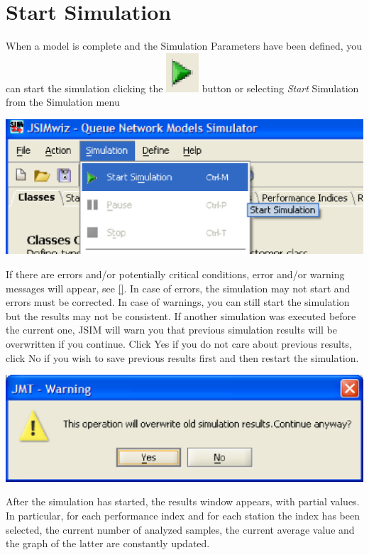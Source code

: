 \section{Start Simulation}
\label{sec:StartSimulation}
When a model is complete and the Simulation Parameters have been defined, you can start the simulation clicking the \includegraphics[scale=.5]{img/jsim/start2.eps} button or selecting \emph{Start} Simulation from the Simulation menu
\begin{center}
\includegraphics[scale=.5]{img/jsim/start1.eps}
\end{center}
If there are errors and/or potentially critical conditions, error and/or warning messages will appear, see \autoref{}. In case of errors, the simulation may not start
and errors must be corrected. In case of warnings, you can still start the simulation but the results may not be consistent.
If another simulation was executed before the current one, JSIM will warn you that previous simulation results will be overwritten if you continue. Click Yes if you do not care about previous results, click No if you wish to save previous results first and then restart the simulation.
\begin{center}
\includegraphics[scale=.5]{img/jsim/confirm.eps}
\end{center}
After the simulation has started, the results window appears, with partial values. In particular, for each performance index and for each station the index has been selected, the current number of analyzed samples, the current average value and the graph of the latter are constantly updated.
